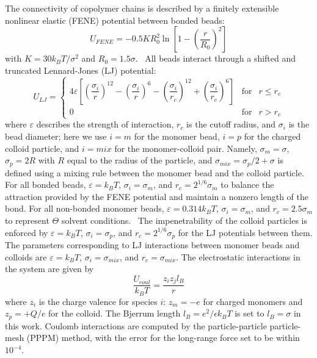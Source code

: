 \documentclass[journal=mamobx, manuscript=article]{achemso}
\begin{document}
The connectivity of copolymer chains is described by a 
finitely extensible nonlinear elastic (FENE) potential between bonded beads:
\begin{equation}
U_{FENE}=
-0.5KR_{0}^{2} \ln \left[ 1 - \left( \dfrac{r}{R_0} \right)^2 \right]
\end{equation} 
with $K=30k_{B}T/\sigma^{2}$ and $R_{0} = 1.5\sigma$.~\cite{kremer1990dynamics}
All beads interact through a shifted and truncated Lennard-Jones (LJ) potential:
\begin{equation}
\label{LJ-c5}
U_{LJ}=\left\{ \begin{array}{lcl}
4 \varepsilon \left[ \left( \dfrac{\sigma_{i}}{r} \right)^{12} - \left( \dfrac{\sigma_{i}}{r} \right)^{6}-\left( \dfrac{\sigma_{i}}{r_c} \right)^{12} + \left( \dfrac{\sigma_{i}}{r_c} \right)^{6}\right] & \mbox{for}
& r\leq r_c  \\
0 & \mbox{for} & r > r_c
\end{array}\right.
\end{equation}
where $\varepsilon$ describes the strength of interaction, $r_c$ is the cutoff radius, and $\sigma_i$ is the bead diameter; here we use $i = m$ for the monomer bead, $i = p$ for the charged colloid particle, and $i = mix$ for the monomer-colloid pair. Namely, $\sigma_{m} = \sigma$, $\sigma_{p} = 2R$ with $R$ equal to the radius of the particle, and $\sigma_{mix} = \sigma_{p} / 2 + \sigma$ is defined using a mixing rule between the monomer bead and the colloid particle. For all bonded beads, $\varepsilon = k_{B}T$, $\sigma_{i} = \sigma_{m}$, and $r_{c} = 2^{1/6}\sigma_{m}$ to balance the attraction provided by the FENE potential and maintain a nonzero length of the bond. For all non-bonded monomer beads, $\varepsilon = 0.314 k_{B}T$, $\sigma_{i} = \sigma_{m}$, and $r_{c} = 2.5\sigma_{m}$ to represent $\Theta$ solvent conditions.~\cite{graessley1999excluded, neitzel2021polyelectrolyte} The impenetrability of the colloid particles is enforced by $\varepsilon = k_{B}T$, $\sigma_{i} = \sigma_{p}$, and $r_{c} = 2^{1/6}\sigma_{p}$ for the LJ potentials between them. The parameters corresponding to LJ interactions between monomer beads and colloids are $\varepsilon = k_{B}T$, $\sigma_{i} = \sigma_{mix}$, and $r_{c} = \sigma_{mix}$.
The electrostatic interactions in the system are given by
\begin{equation}
\frac{U_{coul}}{k_{B}T}=\frac{z_{i}z_{j}l_{B}}{r}
\end{equation}
where $z_{i}$ is the charge valence for species $i$: $z_{m} = -e$ for charged monomers and $z_{p} = +Q/e$ for the colloid. The Bjerrum length $l_{B} = e^2 / \epsilon k_B T$ is set to $l_{B} = \sigma$ in this work. Coulomb interactions are computed by the particle-particle particle-mesh (PPPM) method, with the error for the long-range force set to be within $10^{-4}$.
\end{document}
